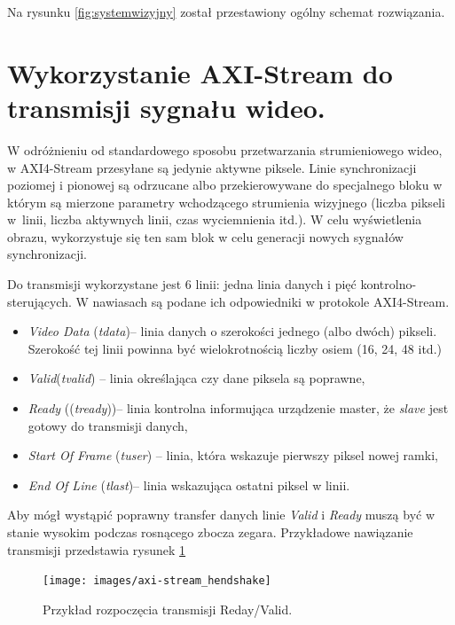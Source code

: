 Na rysunku \ref{fig:systemwizyjny} został przestawiony ogólny schemat rozwiązania.
\section{Wykorzystanie AXI-Stream do transmisji sygnału wideo.} 
W odróżnieniu od standardowego sposobu przetwarzania strumieniowego wideo, w AXI4-Stream przesyłane są jedynie aktywne piksele. 
Linie synchronizacji poziomej i pionowej są odrzucane albo przekierowywane do specjalnego bloku w którym są mierzone parametry wchodzącego strumienia wizyjnego (liczba pikseli w~linii, liczba aktywnych linii, czas wyciemnienia itd.). 
W celu wyświetlenia obrazu, wykorzystuje się ten sam blok w celu generacji nowych sygnałów synchronizacji. 

Do transmisji wykorzystane jest 6 linii: jedna linia danych i pięć kontrolno-sterujących. W nawiasach są podane ich odpowiedniki w protokole AXI4-Stream.
\begin{itemize}
\item \textit{Video Data} (\textit{tdata})-- linia danych o szerokości jednego (albo dwóch) pikseli. Szerokość tej linii powinna być wielokrotnością liczby osiem (16, 24, 48 itd.)
\item \textit{Valid}(\textit{tvalid}) -- linia określająca czy dane piksela są poprawne,
\item \textit{Ready} ((\textit{tready}))-- linia kontrolna informująca urządzenie master, że \textit{slave} jest gotowy do transmisji danych, %
\item \textit{Start Of Frame} (\textit{tuser}) -- linia, która wskazuje pierwszy piksel nowej ramki,
\item \textit{End Of Line} (\textit{tlast})-- linia wskazująca ostatni piksel w linii. %

\end{itemize}
Aby mógł wystąpić poprawny transfer danych linie \textit{Valid} i \textit{Ready} muszą być w stanie wysokim podczas rosnącego zbocza zegara. 
Przykładowe nawiązanie transmisji przedstawia rysunek \ref{fig:handshake}

\begin{figure}[h]
    \centering
    \texttt{[image: images/axi-stream\_hendshake]}
    \caption{Przykład rozpoczęcia transmisji Reday/Valid.}
    \label{fig:handshake}
\end{figure}

